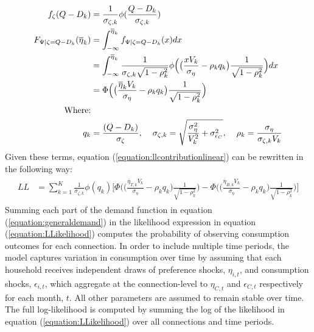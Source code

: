 \documentclass[12pt]{article}
\begin{document}
\begin{align*}
f_{\zeta}( Q - D_k ) &= \frac{1}{\sigma_{\zeta,k}} \phi(\frac{Q - D_k}{\sigma_{\zeta,k}} ) \\
F_{ \Psi | \zeta = Q - D_k } (\overline{\eta}_{k}) &= \int_{-\infty}^{\overline{\eta}_{k}} f_{\Psi | \zeta = Q - D_k} (x) dx \\
&= \int_{-\infty}^{\overline{\eta}_{k}} \frac{1}{\sigma_{\zeta,k} \sqrt{1-\rho_k^2}}\phi \Big ( \big ( \frac{ x V_k}{\sigma_\eta} -  \rho_k q_{k} \big )\frac{1}{\sqrt{1-\rho_k^2}}   \Big ) dx \\
&= \Phi \Big ( \big ( \frac{\overline{\eta}_{k} V_k}{\sigma_\eta} -  \rho_k q_{k} \big )\frac{1}{\sqrt{1-\rho_k^2}}   \Big ) \\
\text{Where:} &\\
q_k &= \frac{(Q - D_k)}{\sigma_\zeta}, \hspace{.4cm}  \sigma_{\zeta,k} = \sqrt{ \frac{\sigma_{\eta}^2}{V_k^2} + \sigma_{\epsilon_C}^2}, \hspace{.4cm} \rho_{k} = \frac{ \sigma_{\eta}}{  \sigma_{\zeta,k} V_k  } 
\end{align*}
Given these terms, equation (\ref{equation:llcontributionlinear}) can be rewritten in the following way:
\begin{align}\label{equation:LLikelihood}
\begin{split}
LL &= \sum_{k=1}^{K}  \frac{1}{\sigma_{\zeta,k}} \phi (q_{k}) \Big[ \Phi \Big ( \big ( \frac{\overline{\eta}_{T,k} V_k}{\sigma_\eta} -  \rho_k q_{k} \big )\frac{1}{\sqrt{1-\rho_k^2}}   \Big ) -  \Phi \Big( \big ( \frac{\overline{\eta}_{B,k} V_k}{\sigma_\eta} -  \rho_k q_{k} \big )\frac{1}{\sqrt{1-\rho_k^2}}   \Big)\Big] 
\end{split}
\end{align}
Summing each part of the demand function in equation (\ref{equation:generaldemand}) in the likelihood expression in equation (\ref{equation:LLikelihood}) computes the probability of observing consumption outcomes for each connection.  In order to include multiple time periods, the model captures variation in consumption over time by assuming that each household receives independent draws of preference shocks, $\eta_{i,t}$, and consumption shocks, $\epsilon_{i,t}$, which aggregate at the connection-level to $\eta_{C,t}$ and $\epsilon_{C,t}$ respectively for each month, $t$.  All other parameters are assumed to remain stable over time.  The full log-likelihood is computed by summing the log of the likelihood in equation  (\ref{equation:LLikelihood}) over all connections and time periods.  
\end{document}

